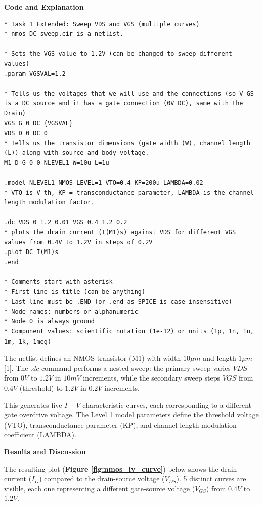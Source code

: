 \documentclass[a4paper,12pt]{article}
\begin{document}
\textbf{Code and Explanation}

\begin{lstlisting}[caption=NMOS Sweep Simulation Code, label=lst:nmos_sweep]
* Task 1 Extended: Sweep VDS and VGS (multiple curves)
* nmos_DC_sweep.cir is a netlist.

* Sets the VGS value to 1.2V (can be changed to sweep different values)
.param VGSVAL=1.2 

* Tells us the voltages that we will use and the connections (so V_GS is a DC source and it has a gate connection (0V DC), same with the Drain)
VGS G 0 DC {VGSVAL}
VDS D 0 DC 0
* Tells us the transistor dimensions (gate width (W), channel length (L)) along with source and body voltage.
M1 D G 0 0 NLEVEL1 W=10u L=1u

.model NLEVEL1 NMOS LEVEL=1 VTO=0.4 KP=200u LAMBDA=0.02
* VTO is V_th, KP = transconductance parameter, LAMBDA is the channel-length modulation factor.

.dc VDS 0 1.2 0.01 VGS 0.4 1.2 0.2
* plots the drain current (I(M1)s) against VDS for different VGS values from 0.4V to 1.2V in steps of 0.2V
.plot DC I(M1)s 
.end

* Comments start with asterisk
* First line is title (can be anything)
* Last line must be .END (or .end as SPICE is case insensitive)
* Node names: numbers or alphanumeric
* Node 0 is always ground
* Component values: scientific notation (1e-12) or units (1p, 1n, 1u, 1m, 1k, 1meg)
\end{lstlisting}

The netlist defines an NMOS transistor (M1) with width $10\mu m$ and length $1\mu m$ [1]. 
The $.dc$ command performs a nested sweep: the primary sweep varies $VDS$ from $0V$ to $1.2V$ in $10mV$ increments, while the secondary sweep steps $VGS$ from $0.4V$ (threshold) to $1.2V$ in $0.2V$ increments. 

This generates five $I-V$ characteristic curves, each corresponding to a different gate overdrive voltage. 
The Level 1 model parameters define the threshold voltage (VTO), transconductance parameter (KP), and channel-length modulation coefficient (LAMBDA).

\textbf{Results and Discussion}

The resulting plot (\textbf{Figure \ref{fig:nmos_iv_curve}}) below shows the drain current ($I_D$) compared to the drain-source voltage ($V_{DS}$). 5 distinct curves are visible, each one representing a different gate-source voltage ($V_{GS}$) from $0.4V$ to $1.2V$.
\end{document}
